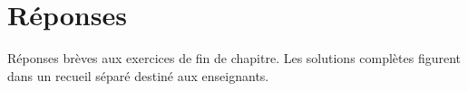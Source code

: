 \chapter{Réponses}
\label{sec:answers}

Réponses brèves aux exercices de fin de chapitre. Les solutions complètes figurent dans un recueil séparé destiné aux enseignants.
























